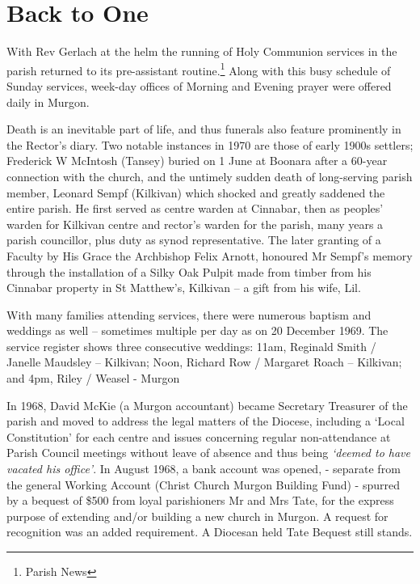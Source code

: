 \section{Back to One}



With Rev Gerlach at the helm the running of Holy Communion services in the parish returned to its pre-assistant routine.\footnote{Parish News} Along with this busy schedule of Sunday services, week-day offices of Morning and Evening prayer were offered daily in Murgon.


Death is an inevitable part of life, and thus funerals also feature prominently in the Rector's diary. Two notable instances in 1970 are those of early 1900s settlers; Frederick W McIntosh (Tansey) buried on 1 June at Boonara after a 60-year connection with the church, and the untimely sudden death of long-serving parish member, Leonard Sempf (Kilkivan) which shocked and greatly saddened the entire parish. He first served as centre warden at Cinnabar, then as peoples' warden for Kilkivan centre and rector's warden for the parish, many years a parish councillor, plus duty as synod representative. The later granting of a Faculty by His Grace the Archbishop Felix Arnott, honoured Mr Sempf's memory through the installation of a Silky Oak Pulpit made from timber from his Cinnabar property in St Matthew's, Kilkivan -- a gift from his wife, Lil.



With many families attending services, there were numerous baptism and weddings as well -- sometimes multiple per day as on 20 December 1969. The service register shows three consecutive weddings: 11am, Reginald Smith / Janelle Maudsley -- Kilkivan; Noon, Richard Row / Margaret Roach -- Kilkivan; and 4pm, Riley / Weasel - Murgon



In 1968, David McKie (a Murgon accountant) became Secretary Treasurer of the parish and moved to address the legal matters of the Diocese, including a `Local Constitution' for each centre and issues concerning regular non-attendance at Parish Council meetings without leave of absence and thus being \emph{`deemed to have vacated his office'}. In August 1968, a bank account was opened, - separate from the general Working Account (Christ Church Murgon Building Fund) - spurred by a bequest of \$500 from loyal parishioners Mr and Mrs Tate, for the express purpose of extending and/or building a new church in Murgon. A request for recognition was an added requirement. A Diocesan held Tate Bequest still stands.



